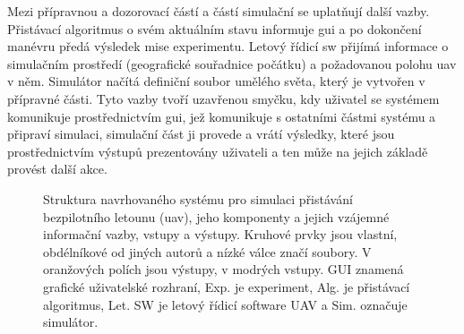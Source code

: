     Mezi přípravnou a dozorovací částí a částí simulační se uplatňují další vazby. Přistávací algoritmus o svém aktuálním stavu informuje \acrshort{gui} a po dokončení manévru předá výsledek mise experimentu. Letový řídicí \acrshort{sw} přijímá informace o simulačním prostředí (geografické souřadnice počátku) a požadovanou polohu \acrshort{uav} v něm. Simulátor načítá definiční soubor umělého světa, který je vytvořen v přípravné části. Tyto vazby tvoří uzavřenou smyčku, kdy uživatel se systémem komunikuje prostřednictvím \acrshort{gui}, jež komunikuje s ostatními částmi systému a připraví simulaci, simulační část ji provede a vrátí výsledky, které jsou prostřednictvím výstupů prezentovány uživateli a ten může na jejich základě provést další akce.
    \begin{figure}
      \caption[Struktura navrhovaného systému]{Struktura navrhovaného systému pro simulaci přistávání bezpilotního letounu (\acrshort{uav}), jeho komponenty a jejich vzájemné informační vazby, vstupy a výstupy. Kruhové prvky jsou vlastní, obdélníkové od jiných autorů a nízké válce značí soubory. V oranžových polích jsou výstupy, v modrých vstupy. GUI znamená grafické uživatelské rozhraní, Exp. je experiment, Alg. je přistávací algoritmus, Let. SW je letový řídicí software UAV a Sim. označuje simulátor.}
      \label{fig:sysStruktura}
    \end{figure}